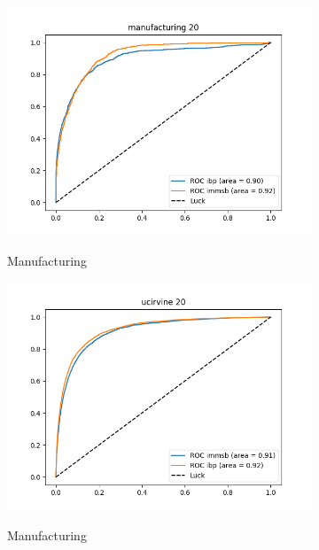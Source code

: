 \begin{figure}[h]
\begin{subfigure}[b]{0.300\textwidth}
            \centering
            \includegraphics[width=\textwidth]{img/corpus/roc_manufacturing_20}
            \label{fig:mean and std of net14}
            \caption {{\small Manufacturing}}    
        \end{subfigure}
        \begin{subfigure}[b]{0.300\textwidth}
            \centering
            \includegraphics[width=\textwidth]{img/corpus/roc_ucirvine_20}
            \label{fig:mean and std of net14}
            \caption {{\small Manufacturing}}    
        \end{subfigure}
        \begin{subfigure}[b]{0.300\textwidth}
            \centering

\end{subfigure}
\end{figure}
